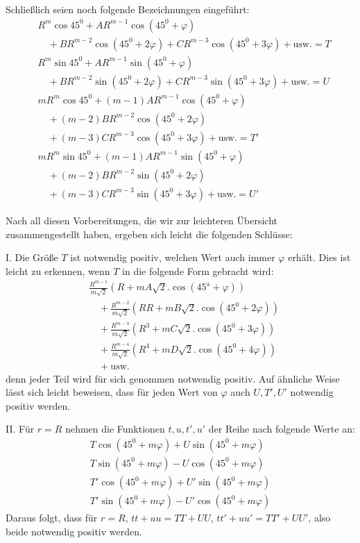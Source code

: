 Schließlich seien noch folgende Bezeichnungen eingeführt:
\[
\begin{aligned}
&R^m\cos45^0+AR^{m-1}\cos(45^0+\varphi)
\\
&\quad+BR^{m-2}\cos(45^0+2\varphi)+CR^{m-3}\cos(45^0+3\varphi)
+\mathrm{usw.}=T\\
&R^m\sin45^0+AR^{m-1}\sin(45^0+\varphi)
\\
&\quad+BR^{m-2}\sin(45^0+2\varphi)+CR^{m-3}\sin(45^0+3\varphi)
+\mathrm{usw.}=U\\
&mR^m\cos45^0+(m-1)AR^{m-1}\cos(45^0+\varphi)
\\
&\quad+(m-2)BR^{m-2}\cos(45^0+2\varphi)
\\
&\quad+(m-3)CR^{m-3}\cos(45^0+3\varphi)+\mathrm{usw.}=T'\\
&mR^m\sin45^0+(m-1)AR^{m-1}\sin(45^0+\varphi)
\\
&\quad+(m-2)BR^{m-2}\sin(45^0+2\varphi)
\\
&\quad+(m-3)CR^{m-3}\sin(45^0+3\varphi)+\mathrm{usw.}=U'
\end{aligned}
\]

Nach all diesen Vorbereitungen, die wir zur leichteren Übersicht zusammengestellt haben, ergeben sich leicht die folgenden Schlüsse:

I. Die Größe $T$ ist notwendig positiv, welchen Wert auch immer $\varphi$ erhält. Dies ist leicht zu erkennen, wenn $T$ in die folgende Form gebracht wird:
\[
\begin{aligned}
&\frac{R^{m-1}}{m\surd2}(R+mA\surd2.\cos(45^{\mathrm{a}}+\varphi))\\
&\quad+\frac{R^{m-2}}{m\surd2}(RR+mB\surd2.\cos(45^0+2\varphi))\\
&\quad+\frac{R^{m-3}}{m\surd2}(R^3+mC\surd2.\cos(45^0+3\varphi))\\
&\quad+\frac{R^{m-4}}{m\surd2}(R^4+mD\surd2.\cos(45^0+4\varphi))\\
&\quad+\mathrm{usw.}
\end{aligned}
\]
denn jeder Teil wird für sich genommen notwendig positiv. Auf ähnliche Weise lässt sich leicht beweisen, dass für jeden Wert von $\varphi$ auch $U,T',U'$ notwendig positiv werden.

II. Für $r=R$ nehmen die Funktionen $t,u,t',u'$ der Reihe nach folgende Werte an:
\[
\begin{gathered}
T\cos(45^0+m\varphi)+U\sin(45^0+m\varphi)\\
T\sin(45^0+m\varphi)-U\cos(45^0+m\varphi)\\
T'\cos(45^0+m\varphi)+U'\sin(45^0+m\varphi)\\
T'\sin(45^0+m\varphi)-U'\cos(45^0+m\varphi)
\end{gathered}
\]
Daraus folgt, dass für $r=R$, $tt+uu=TT+UU$, $tt'+uu'=TT'+UU'$, also beide notwendig positiv werden.

